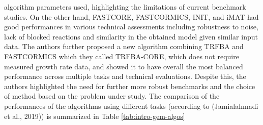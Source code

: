\documentclass[12pt,twoside,openany,\mydriver]{thesis}  %
\begin{document}
algorithm parameters used, highlighting the limitations of current benchmark studies. On the other hand, FASTCORE, FASTCORMICS, INIT, and iMAT had good performances in various technical assessments including robustness to noise, lack of blocked reactions and similarity in the obtained model given similar input data. The authors further proposed a new algorithm combining TRFBA and FASTCORMICS which they called TRFBA-CORE, which does not require measured growth rate data, and showed it to have overall the most balanced performance across multiple tasks and technical evaluations. Despite this, the authors highlighted the need for further more robust benchmarks and the choice of method based on the problem under study. The comparison of the performances of the algorithms using different tasks (according to (Jamialahmadi et al., 2019)) is summarized in Table \ref{tab:intro-gem-algos}
\end{document}
